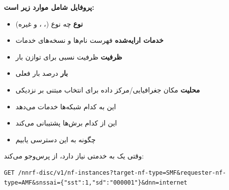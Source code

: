 \begin{Shaded}
\begin{Highlighting}[]
      \FunctionTok{:} 
    \FunctionTok{\}}
  \OtherTok{]}\FunctionTok{,}
  \FunctionTok{:} \FunctionTok{\{}
    \FunctionTok{:} \OtherTok{[}\FunctionTok{\{}\FunctionTok{:} \FunctionTok{\{}\FunctionTok{:} \FunctionTok{\},} \FunctionTok{:} \OtherTok{[}\FunctionTok{\{}\FunctionTok{:} \FunctionTok{\}}\OtherTok{]}\FunctionTok{\}}\OtherTok{]}
  \FunctionTok{\},}
  \FunctionTok{:} \FunctionTok{,}
  \FunctionTok{:} \FunctionTok{,}
  \FunctionTok{:} 
\FunctionTok{\}}
\end{Highlighting}
\end{Shaded}

\textbf{پروفایل  شامل موارد زیر است:}

\begin{itemize}
\tightlist
\item
  \textbf{نوع }  چه نوع  (، ،  و غیره)
\item
  \textbf{خدمات ارایه‌شده}  فهرست نام‌ها و نسخه‌های خدمات
\item
  \textbf{ظرفیت}  ظرفیت نسبی برای توازن بار 
\item
  \textbf{بار}  درصد بار فعلی 
\item
  \textbf{محلیت}  مکان جغرافیایی/\allowbreak{}مرکز داده برای انتخاب مبتنی بر نزدیکی
\item
    این  به کدام شبکه‌ها خدمات می‌دهد
\item
    این  از کدام برش‌ها پشتیبانی می‌کند
\item
    چگونه به این  دسترسی یابیم
\end{itemize}


وقتی یک  به خدمتی نیاز دارد، از  پرس‌وجو می‌کند:

\def\CNcodelang{}

\begin{CNplaincode}
\begin{Verbatim}
GET /nnrf-disc/v1/nf-instances?target-nf-type=SMF&requester-nf-type=AMF&snssai={"sst":1,"sd":"000001"}&dnn=internet
\end{Verbatim}
\end{CNplaincode}

